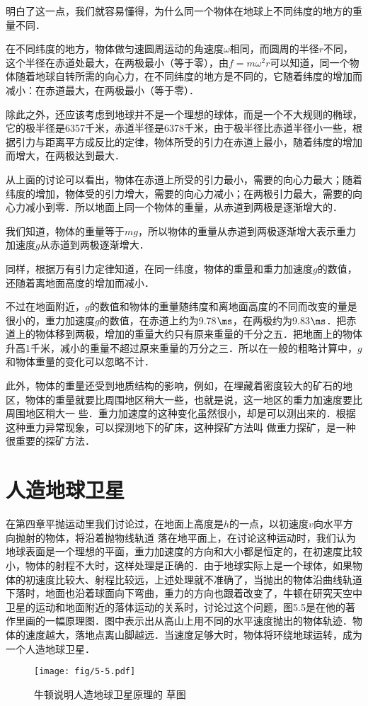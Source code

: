 明白了这一点，我们就容易懂得，为什么同一个物体在地球上不同纬度的地方的重量不同．

在不同纬度的地方，物体做匀速圆周运动的角速度$\omega$相同，而圆周的半径$r$不同，这个半径在赤道处最大，在两极最小（等于零），由$f=m\omega^2 r$可以知道，同一个物体随着地球自转所需的向心力，在不同纬度的地方是不同的，它随着纬度的增加而减小：在赤道最大，在两极最小（等于零）．

除此之外，还应该考虑到地球并不是一个理想的球体，而是一个不大规则的椭球，它的极半径是6357千米，赤道半径是6378千米，由于极半径比赤道半径小一些，根据引力与距离平方成反比的定律，物体所受的引力在赤道上最小，随着纬度的增加而增大，在两极达到最大．

从上面的讨论可以看出，物体在赤道上所受的引力最小，需要的向心力最大；随着纬度的增加，物体受的引力增大，需要的向心力减小；在两极引力最大，需要的向心力减小到零．所以地面上同一个物体的重量，从赤道到两极是逐渐增大的．

我们知道，物体的重量等于$mg$，所以物体的重量从赤道到两极逐渐增大表示重力加速度$g$从赤道到两极逐渐增大．

同样，根据万有引力定律知道，在同一纬度，物体的重量和重力加速度$g$的数值，还随着离地面高度的增加而减小．

不过在地面附近，$g$的数值和物体的重量随纬度和离地面高度的不同而改变的量是很小的，重力加速度$g$的数值，在赤道上约为9.78$\ms$，在两极约为9.83$\ms$．把赤道上的物体移到两极，增加的重量大约只有原来重量的千分之五．把地面上的物体升高1千米，减小的重量不超过原来重量的万分之三．所以在一般的粗略计算中，$g$和物体重量的变化可以忽略不计．

此外，物体的重量还受到地质结构的影响，例如，在埋藏着密度较大的矿石的地区，物体的重量就要比周围地区稍大一些，也就是说，这一地区的重力加速度要比周围地区稍大一
些．重力加速度的这种变化虽然很小，却是可以测出来的．根据这种重力异常现象，可以探测地下的矿床，这种探矿方法叫
做重力探矿，是一种很重要的探矿方法．

\section{人造地球卫星}

在第四章平抛运动里我们讨论过，在地面上高度是$h$的一点，以初速度$v$向水平方向抛射的物体，将沿着抛物线轨道
落在地平面上，在讨论这种运动时，我们认为地球表面是一个理想的平面，重力加速度的方向和大小都是恒定的，在初速度比较小，物体的射程不大时，这样处理是正确的．由于地球实际上是一个球体，如果物体的初速度比较大、射程比较远，上述处理就不准确了，当抛出的物体沿曲线轨道下落时，地面也沿着球面向下弯曲，重力的方向也跟着改变了，牛顿在研究天空中卫星的运动和地面附近的落体运动的关系时，讨论过这个问题，图5.5是在他的著作里画的一幅原理图．图中表示出从高山上用不同的水平速度抛出的物体轨迹．物体的速度越大，落地点离山脚越远．当速度足够大时，物体将环绕地球运转，成为一个人造地球卫星．
\begin{figure}\centering
\texttt{[image: fig/5-5.pdf]}
\caption{牛顿说明人造地球卫星原理的
草图}
\end{figure}

